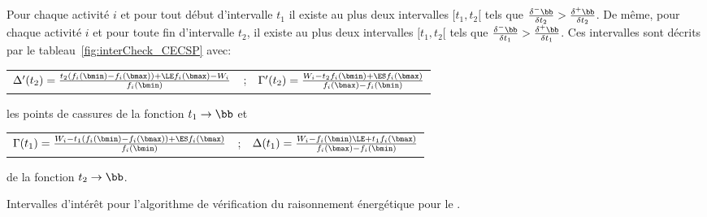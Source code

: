 \begin{theo}
  Pour chaque activité $i$ et pour tout début d'intervalle $t_1$ il
  existe au plus deux intervalles $[t_1,t_2[$ tels que
  $\frac{\delta^{-}\bb}{\delta t_2} >
  \frac{\delta^{+}\bb}{\delta t_2} $. 
  De même,  pour chaque activité $i$ et pour toute fin d'intervalle $t_2$, il
  existe au plus deux intervalles $[t_1,t_2[$ tels que
  $\frac{\delta^{-}\bb}{\delta t_1} >
  \frac{\delta^{+}\bb}{\delta t_1} $. 
  Ces intervalles sont décrits
  par le tableau~\ref{fig:interCheck_CECSP} avec:
  \begin{center}
    \begin{tabular}{lcr}
      $\Delta'(t_2)=\frac{t_2(f_i(\bmin)-f_i(\bmax))+\LE f_i(\bmax)-W_i}{f_i(\bmin)}$
      & ;
      &$\Gamma'(t_2)=\frac{W_i-t_2f_i(\bmin)+\ES f_i(\bmax)}{f_i(\bmax)-f_i(\bmin)}$
    \end{tabular}
  \end{center}

les points de cassures de la fonction $t_1 \rightarrow \bb$ et 

\begin{center}
\begin{tabular}{lcr}
  $\Gamma(t_1)=\frac{W_i-t_1(f_i(\bmin)-f_i(\bmax))+\ES f_i(\bmax)}{f_i(\bmin)}$&
  ;
  &$\Delta(t_1)=\frac{W_i-f_i(\bmin)\LE +t_1f_i(\bmax)}{f_i(\bmax)-f_i(\bmin)}$
\end{tabular}
\end{center}

de la fonction $t_2 \rightarrow \bb$.

\begin{table} 
  
  \caption{Intervalles d'intérêt pour l'algorithme de vérification du
    raisonnement énergétique pour le \CECSP.}
  \label{fig:interCheck_CECSP}
\end{table}
\end{theo}

